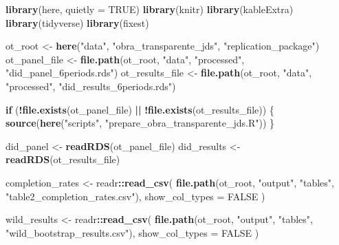 \documentclass[
]{article}
\newenvironment{Shaded}{\begin{snugshade}}{\end{snugshade}}
\newcommand{\AttributeTok}[1]{\textcolor[rgb]{0.13,0.29,0.53}{#1}}
\newcommand{\ConstantTok}[1]{\textcolor[rgb]{0.56,0.35,0.01}{#1}}
\newcommand{\ControlFlowTok}[1]{\textcolor[rgb]{0.13,0.29,0.53}{\textbf{#1}}}
\newcommand{\FunctionTok}[1]{\textcolor[rgb]{0.13,0.29,0.53}{\textbf{#1}}}
\newcommand{\NormalTok}[1]{#1}
\newcommand{\OtherTok}[1]{\textcolor[rgb]{0.56,0.35,0.01}{#1}}
\newcommand{\SpecialCharTok}[1]{\textcolor[rgb]{0.81,0.36,0.00}{\textbf{#1}}}
\newcommand{\StringTok}[1]{\textcolor[rgb]{0.31,0.60,0.02}{#1}}
\begin{document}
\begin{Shaded}
\begin{Highlighting}[]
\FunctionTok{library}\NormalTok{(here, }\AttributeTok{quietly =} \ConstantTok{TRUE}\NormalTok{)}
\FunctionTok{library}\NormalTok{(knitr)}
\FunctionTok{library}\NormalTok{(kableExtra)}
\FunctionTok{library}\NormalTok{(tidyverse)}
\FunctionTok{library}\NormalTok{(fixest)}

\NormalTok{ot\_root }\OtherTok{\textless{}{-}} \FunctionTok{here}\NormalTok{(}\StringTok{"data"}\NormalTok{, }\StringTok{"obra\_transparente\_jds"}\NormalTok{, }\StringTok{"replication\_package"}\NormalTok{)}
\NormalTok{ot\_panel\_file }\OtherTok{\textless{}{-}} \FunctionTok{file.path}\NormalTok{(ot\_root, }\StringTok{"data"}\NormalTok{, }\StringTok{"processed"}\NormalTok{, }\StringTok{"did\_panel\_6periods.rds"}\NormalTok{)}
\NormalTok{ot\_results\_file }\OtherTok{\textless{}{-}} \FunctionTok{file.path}\NormalTok{(ot\_root, }\StringTok{"data"}\NormalTok{, }\StringTok{"processed"}\NormalTok{, }\StringTok{"did\_results\_6periods.rds"}\NormalTok{)}

\ControlFlowTok{if}\NormalTok{ (}\SpecialCharTok{!}\FunctionTok{file.exists}\NormalTok{(ot\_panel\_file) }\SpecialCharTok{||} \SpecialCharTok{!}\FunctionTok{file.exists}\NormalTok{(ot\_results\_file)) \{}
  \FunctionTok{source}\NormalTok{(}\FunctionTok{here}\NormalTok{(}\StringTok{"scripts"}\NormalTok{, }\StringTok{"prepare\_obra\_transparente\_jds.R"}\NormalTok{))}
\NormalTok{\}}

\NormalTok{did\_panel }\OtherTok{\textless{}{-}} \FunctionTok{readRDS}\NormalTok{(ot\_panel\_file)}
\NormalTok{did\_results }\OtherTok{\textless{}{-}} \FunctionTok{readRDS}\NormalTok{(ot\_results\_file)}

\NormalTok{completion\_rates }\OtherTok{\textless{}{-}}\NormalTok{ readr}\SpecialCharTok{::}\FunctionTok{read\_csv}\NormalTok{(}
  \FunctionTok{file.path}\NormalTok{(ot\_root, }\StringTok{"output"}\NormalTok{, }\StringTok{"tables"}\NormalTok{, }\StringTok{"table2\_completion\_rates.csv"}\NormalTok{),}
  \AttributeTok{show\_col\_types =} \ConstantTok{FALSE}
\NormalTok{)}

\NormalTok{wild\_results }\OtherTok{\textless{}{-}}\NormalTok{ readr}\SpecialCharTok{::}\FunctionTok{read\_csv}\NormalTok{(}
  \FunctionTok{file.path}\NormalTok{(ot\_root, }\StringTok{"output"}\NormalTok{, }\StringTok{"tables"}\NormalTok{, }\StringTok{"wild\_bootstrap\_results.csv"}\NormalTok{),}
  \AttributeTok{show\_col\_types =} \ConstantTok{FALSE}
\NormalTok{)}


\end{Highlighting}
\end{Shaded}
\end{document}
